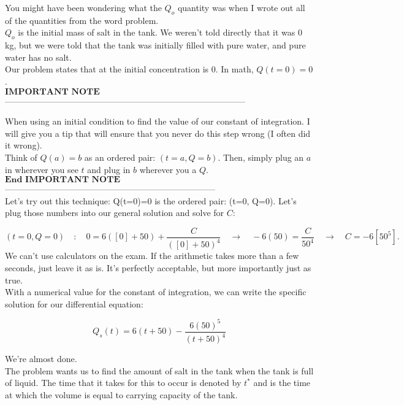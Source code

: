 \documentclass[a4paper,12pt]{article}
\begin{document}
You might have been wondering what the $Q_o$ quantity was when I wrote out all of the quantities from the word problem.\\

$Q_o$ is the initial mass of salt in the tank. We weren't told directly that it was 0 kg, but we were told that the tank was initially filled with pure water, and pure water has no salt.\\

Our problem states that at the initial concentration is 0. In math, $Q(t=0)=0$.\\

$\boxed{\textbf{IMPORTANT NOTE}}$------------------------------------------------------------------------------------

When using an initial condition to find the value of our constant of integration. I will give you a tip that will ensure that you never do this step wrong (I often did it wrong).\\

Think of $Q(a) = b$ as an ordered pair: $(t=a,Q=b)$. Then, simply plug an $a$ in wherever you see $t$ and plug in $b$ wherever you a $Q$.\\

$\boxed{\textbf{End IMPORTANT NOTE}}$--------------------------------------------------------------------------\\

Let's try out this technique: Q(t=0)=0 is the ordered pair: (t=0, Q=0). Let's plug those numbers into our general solution and solve for $C$:

$$ (t=0,Q=0)\quad:\quad 0 = 6([0] + 50) + \frac{C}{([0] + 50)^4} \quad\rightarrow\quad  -6 (50) = \frac{C}{50^4}\quad\rightarrow\quad C = -6[50^5].
 $$
We can't use calculators on the exam. If the arithmetic takes more than a few seconds, just leave it as is. It's perfectly acceptable, but more importantly just as true.\\

With a numerical value for the constant of integration, we can write the specific solution for our differential equation:

$$ \boxed{Q_s(t)=6(t+50)-\frac{6(50)^5}{(t+50)^4}} $$

We're almost done.\\

The problem wants us to find the amount of salt in the tank when the tank is full of liquid. The time that it takes for this to occur is denoted by $t^*$ and is the time at which the volume is equal to carrying capacity of the tank.
\end{document}
